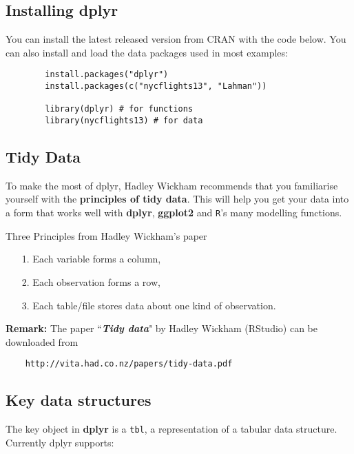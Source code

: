 \documentclass{article}
\begin{document}
	\subsection{Installing dplyr}
	You can install the latest released version from CRAN with the code below.
	You can also install and load the data packages used in most examples: 
	\begin{framed}
		\begin{verbatim}
		install.packages("dplyr")
		install.packages(c("nycflights13", "Lahman"))
		
		library(dplyr) # for functions
		library(nycflights13) # for data
		\end{verbatim}
	\end{framed}
	
	\subsection{Tidy Data}
	To make the most of dplyr, Hadley Wickham recommends that you familiarise yourself with the \textbf{principles of tidy data}. This will help you get your data into a form that works well with \textbf{dplyr}, \textbf{ggplot2} and \texttt{R}'s many modelling functions.\\
	\bigskip
	
	\begin{framed}
		\noindent Three Principles from Hadley Wickham's paper
		\begin{itemize}
			\item[1.] Each variable forms a column, 
			\item[2.] Each observation forms a row, 
			\item[3.] Each table/file stores data about one kind of observation.
		\end{itemize}
	\end{framed}
	\noindent \textbf{Remark:}  The paper ``\textit{\textbf{Tidy data}}" by Hadley Wickham (RStudio) can be downloaded from 
	\begin{verbatim}
	http://vita.had.co.nz/papers/tidy-data.pdf
	\end{verbatim}
	
	
	\subsection{Key data structures}
	
	The key object in \textbf{dplyr} is a \texttt{tbl}, a representation of a tabular data structure. Currently dplyr supports:
	
\end{document}
